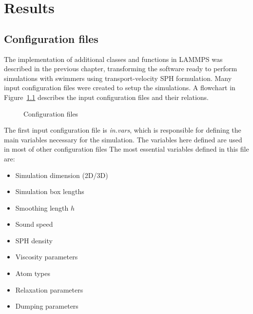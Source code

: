 

\chapter{Results}
\label{chap:chapter_4}



\section{Configuration files}
\label{sec:section 1}

The implementation of additional classes and functions in LAMMPS was described in the previous chapter, transforming the software ready to perform simulations with swimmers using
transport-velocity SPH formulation. Many input configuration files were created to setup the simulations. A flowchart in Figure~\ref{fig:Bild4.1} describes the input configuration
files and their relations.

\begin{figure}[H]
\centering
  \begin{footnotesize}
  
  \caption[Configuration files]{Configuration files}
  \label{fig:Bild4.1}
  \end{footnotesize}
\end{figure} 

The first input configuration file is \textit{in.vars}, which is responsible for defining the main variables necessary for the simulation. The variables here defined are used in most of other configuration files 
The most essential variables defined in this file are:

\begin{itemize}
  \item Simulation dimension (2D/3D)
  \item Simulation box lengths
  \item Smoothing length $h$
  \item Sound speed
  \item SPH density
  \item Viscosity parameters
  \item Atom types
  \item Relaxation parameters
  \item Dumping parameters
\end{itemize}



